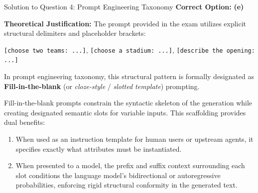 \documentclass[11pt,a4paper]{article}
\begin{document}
\newpage

\begin{solutionbox}{Solution to Question 4: Prompt Engineering Taxonomy}
\textbf{Correct Option:} \textbf{(e)}

\medskip
\textbf{Theoretical Justification:}
The prompt provided in the exam utilizes explicit structural delimiters and placeholder brackets:
\begin{center}
\texttt{[choose two teams: ...]}, \quad \texttt{[choose a stadium: ...]}, \quad \texttt{[describe the opening: ...]}
\end{center}
In prompt engineering taxonomy, this structural pattern is formally designated as \textbf{Fill-in-the-blank} (or \textit{cloze-style} / \textit{slotted template}) prompting. 

Fill-in-the-blank prompts constrain the syntactic skeleton of the generation while creating designated semantic slots for variable inputs. This scaffolding provides dual benefits:
\begin{enumerate}[label=\arabic*.]
    \item When used as an instruction template for human users or upstream agents, it specifies exactly what attributes must be instantiated.
    \item When presented to a model, the prefix and suffix context surrounding each slot conditions the language model's bidirectional or autoregressive probabilities, enforcing rigid structural conformity in the generated text.
\end{enumerate}


\end{solutionbox}
\end{document}
